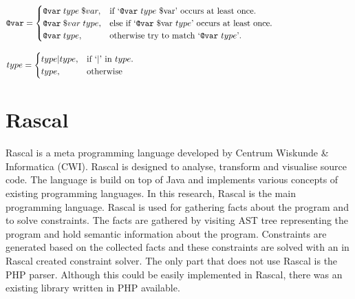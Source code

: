 \documentclass[../main.tex]{subfiles}
\begin{document}
\begin{equation}
  \begin{aligned}
  \texttt{@var}=\begin{cases}
    \texttt{@var} \; type \; \$var, & \text{if `\texttt{@var} $type$ \$var' occurs at least once}.\\
    \texttt{@var} \; \$var \; type, & \text{else if `\texttt{@var} \$var $type$' occurs at least once}.\\
    \texttt{@var} \; type, & \text{otherwise try to match `\texttt{@var} $type$'}.\\
  \end{cases}
  \end{aligned}
  \phantom{\hspace{3.2cm}} %
\end{equation}

\begin{equation}
  \begin{aligned}
  type=\begin{cases}
    type|type, & \text{if `$\vert$' in $type$}.\\
    type, & \text{otherwise}
  \end{cases}
  \end{aligned}
  \phantom{\hspace{8.8cm}} %
\end{equation}
 
    \section{Rascal}\label{sec:background_rascal}
    \Gls{Rascal}\cite{Kli:09} is a meta programming language developed by Centrum Wiskunde \& Informatica (CWI).
    Rascal is designed to analyse, transform and visualise source code.
    The language is build on top of Java and implements various concepts of existing programming languages.
    In this research, Rascal is the main programming language.
    Rascal is used for gathering facts about the program and to solve constraints.
    The facts are gathered by visiting AST tree representing the program and hold semantic information about the program.
    Constraints are generated based on the collected facts and these constraints are solved with an in Rascal created constraint solver.
    The only part that does not use Rascal is the PHP parser.
    Although this could be easily implemented in Rascal, there was an existing library written in PHP available.
\end{document}
